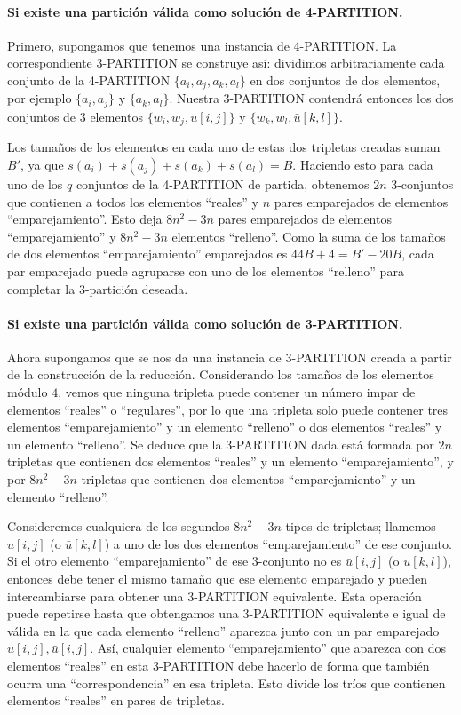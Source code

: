 \documentclass{article}
\begin{document}
\paragraph{Si existe una partición válida como solución de 4-PARTITION.}

Primero, supongamos que tenemos una instancia de 4-PARTITION. La correspondiente 3-PARTITION se construye así: dividimos arbitrariamente cada conjunto de la 4-PARTITION $\{a_i,a_j,a_k,a_l\}$ en dos conjuntos de dos elementos, por ejemplo $\{a_i,a_j\}$ y $\{a_k,a_l\}$. Nuestra 3-PARTITION contendrá entonces los dos conjuntos de 3 elementos $\{w_i,w_j,u[i,j]\}$ y $\{w_k,w_l,\bar{u}[k,l]\}$.

Los tamaños de los elementos en cada uno de estas dos tripletas creadas suman $B'$, ya que $s(a_i)+s(a_j)+s(a_k)+s(a_l)=B$. Haciendo esto para cada uno de los $q$ conjuntos de la 4-PARTITION de partida, obtenemos $2n$ 3-conjuntos que contienen a todos los elementos ``reales'' y $n$ pares emparejados de elementos ``emparejamiento''. Esto deja $8n^2-3n$ pares emparejados de elementos ``emparejamiento'' y $8n^2-3n$ elementos ``relleno''. Como la suma de los tamaños de dos elementos ``emparejamiento'' emparejados es $44B+4=B'-20B$, cada par emparejado puede agruparse con uno de los elementos ``relleno'' para completar la 3-partición deseada.

\paragraph{Si existe una partición válida como solución de 3-PARTITION.}

Ahora supongamos que se nos da una instancia de 3-PARTITION creada a partir de la construcción de la reducción. Considerando los tamaños de los elementos módulo $4$, vemos que ninguna tripleta puede contener un número impar de elementos ``reales'' o ``regulares'', por lo que una tripleta solo puede contener tres elementos ``emparejamiento'' y un elemento ``relleno'' o dos elementos ``reales'' y un elemento ``relleno''. Se deduce que la 3-PARTITION dada está formada por $2n$ tripletas que contienen dos elementos ``reales'' y un elemento ``emparejamiento'', y por $8n^2-3n$ tripletas que contienen dos elementos ``emparejamiento'' y un elemento ``relleno''.

Consideremos cualquiera de los segundos $8n^2-3n$ tipos de tripletas; llamemos $u[i,j]$ (o $\bar{u}[k,l]$) a uno de los dos elementos ``emparejamiento'' de ese conjunto. Si el otro elemento ``emparejamiento'' de ese 3-conjunto no es $\bar{u}[i,j]$ (o $u[k,l]$), entonces debe tener el mismo tamaño que ese elemento emparejado y pueden intercambiarse para obtener una 3-PARTITION equivalente. Esta operación puede repetirse hasta que obtengamos una 3-PARTITION equivalente e igual de válida en la que cada elemento ``relleno'' aparezca junto con un par emparejado $u[i,j],\bar{u}[i,j]$. Así, cualquier elemento ``emparejamiento'' que aparezca con dos elementos ``reales'' en esta 3-PARTITION debe hacerlo de forma que también ocurra una ``correspondencia'' en esa tripleta. Esto divide los tríos que contienen elementos ``reales'' en pares de tripletas.
\end{document}
